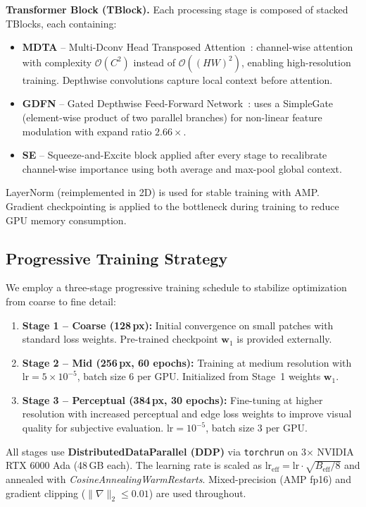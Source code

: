 \documentclass[10pt,twocolumn,letterpaper]{article}
\begin{document}
\noindent\textbf{Transformer Block (TBlock).}
Each processing stage is composed of stacked TBlocks, each containing:
\begin{itemize}
  \item \textbf{MDTA} -- Multi-Dconv Head Transposed Attention~\cite{restormer}:
        channel-wise attention with complexity $\mathcal{O}(C^2)$ instead of
        $\mathcal{O}((HW)^2)$, enabling high-resolution training.
        Depthwise convolutions capture local context before attention.
  \item \textbf{GDFN} -- Gated Depthwise Feed-Forward Network~\cite{restormer}:
        uses a SimpleGate (element-wise product of two parallel branches)
        for non-linear feature modulation with expand ratio $2.66\times$.
  \item \textbf{SE} -- Squeeze-and-Excite block applied after every stage
        to recalibrate channel-wise importance using both average and
        max-pool global context.
\end{itemize}
LayerNorm (reimplemented in 2D) is used for stable training with AMP.
Gradient checkpointing is applied to the bottleneck during training to reduce
GPU memory consumption.

\subsection{Progressive Training Strategy}

We employ a three-stage progressive training schedule to stabilize
optimization from coarse to fine detail:

\begin{enumerate}
  \item \textbf{Stage 1 -- Coarse (128\,px):}
        Initial convergence on small patches with standard loss weights.
        Pre-trained checkpoint $\mathbf{w}_1$ is provided externally.
  \item \textbf{Stage 2 -- Mid (256\,px, 60 epochs):}
        Training at medium resolution with
        $\text{lr}{=}5{\times}10^{-5}$, batch size $6$ per GPU.
        Initialized from Stage~1 weights $\mathbf{w}_1$.
  \item \textbf{Stage 3 -- Perceptual (384\,px, 30 epochs):}
        Fine-tuning at higher resolution with increased perceptual and
        edge loss weights to improve visual quality for subjective evaluation.
        lr${}=10^{-5}$, batch size $3$ per GPU.
\end{enumerate}

All stages use \textbf{DistributedDataParallel (DDP)} via \texttt{torchrun}
on 3$\times$ NVIDIA RTX 6000 Ada (48\,GB each).
The learning rate is scaled as $\text{lr}_{\text{eff}} = \text{lr} \cdot \sqrt{B_{\text{eff}}/8}$
and annealed with \textit{CosineAnnealingWarmRestarts}.
Mixed-precision (AMP fp16) and gradient clipping ($\|\nabla\|_2 \leq 0.01$) are used throughout.
\end{document}
